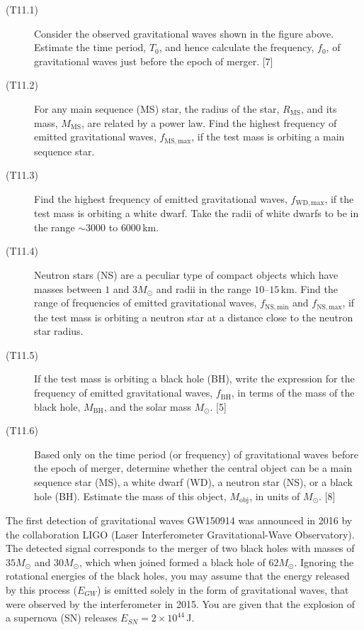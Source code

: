 \begin{description}
\item[(T11.1)] Consider the observed gravitational waves shown in the figure
  above. Estimate the time period, $T_0$, and hence calculate the frequency,
  $f_0$, of gravitational waves just before the epoch of merger. \hfill[7]
\item[(T11.2)] For any main sequence (MS) star, the radius of the star,
  $R_{\mathrm{MS}}$, and its mass, $M_{\mathrm{MS}}$, are related by a power
  law. Find the highest frequency of emitted gravitational waves,
  $f_{\mathrm{MS,max}}$, if the test mass is orbiting a main sequence star.
\item[(T11.3)] Find the highest frequency of emitted gravitational waves,
  $f_{\mathrm{WD,max}}$, if the test mass is orbiting a white dwarf. Take the
  radii of white dwarfs to be in the range $\sim 3000$ to $6000$\,km.
\item[(T11.4)] Neutron stars (NS) are a peculiar type of compact objects which
  have masses between $1$ and $3M_\odot$ and radii in the range $10$--$15$\,km.
  Find the range of frequencies of emitted gravitational waves,
  $f_{\mathrm{NS,min}}$ and $f_{\mathrm{NS,max}}$, if the test mass is orbiting
  a neutron star at a distance close to the neutron star radius.
\item[(T11.5)] If the test mass is orbiting a black hole (BH), write the
  expression for the frequency of emitted gravitational waves,
  $f_{\mathrm{BH}}$, in terms of the mass of the black hole,
  $M_{\mathrm{BH}}$, and the solar mass $M_\odot$. \hfill[5]
\item[(T11.6)] Based only on the time period (or frequency) of gravitational
  waves before the epoch of merger, determine whether the central object can be
  a main sequence star (MS), a white dwarf (WD), a neutron star (NS), or a
  black hole (BH). Estimate the mass of this object, $M_{\mathrm{obj}}$, in
  units of $M_\odot$. \hfill[8]
\end{description}

The first detection of gravitational waves GW150914 was announced in 2016 by
the collaboration LIGO (Laser Interferometer Gravitational-Wave Observatory).
The detected signal corresponds to the merger of two black holes with masses of
$35M_\odot$ and $30M_\odot$, which when joined formed a black hole of
$62M_\odot$. Ignoring the rotational energies of the black holes, you may assume
that the energy released by this process ($E_{GW}$) is emitted solely in the
form of gravitational waves, that were observed by the interferometer in 2015.
You are given that the explosion of a supernova (SN) releases
$E_{SN} = 2 \times 10^{44}$\,J.

